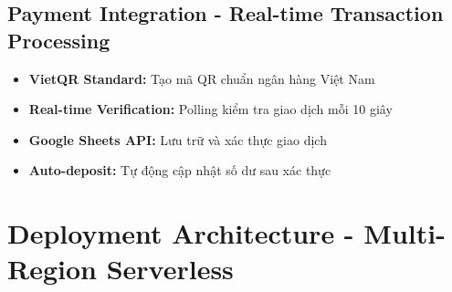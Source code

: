\documentclass[12pt,a4paper]{article}
\begin{document}
\subsection{Payment Integration - Real-time Transaction Processing}
\begin{itemize}[leftmargin=*]
    \item \textbf{VietQR Standard:} Tạo mã QR chuẩn ngân hàng Việt Nam
    \item \textbf{Real-time Verification:} Polling kiểm tra giao dịch mỗi 10 giây
    \item \textbf{Google Sheets API:} Lưu trữ và xác thực giao dịch
    \item \textbf{Auto-deposit:} Tự động cập nhật số dư sau xác thực
\end{itemize}

\section{Deployment Architecture - Multi-Region Serverless}
\end{document}
